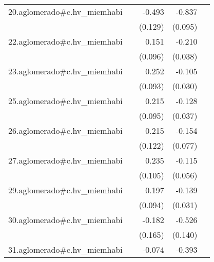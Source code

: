 {\begin{longtable}{l*{4}{D{.}{.}{-1}}}
\addlinespace
20.aglomerado#c.hv\_miemhabi&                     &      -0.493\sym{***}&      -0.837\sym{***}&                     \\
            &                     &     (0.129)         &     (0.095)         &                     \\
\addlinespace
22.aglomerado#c.hv\_miemhabi&                     &       0.151         &      -0.210\sym{***}&                     \\
            &                     &     (0.096)         &     (0.038)         &                     \\
\addlinespace
23.aglomerado#c.hv\_miemhabi&                     &       0.252\sym{**} &      -0.105\sym{***}&                     \\
            &                     &     (0.093)         &     (0.030)         &                     \\
\addlinespace
25.aglomerado#c.hv\_miemhabi&                     &       0.215\sym{*}  &      -0.128\sym{***}&                     \\
            &                     &     (0.095)         &     (0.037)         &                     \\
\addlinespace
26.aglomerado#c.hv\_miemhabi&                     &       0.215         &      -0.154\sym{*}  &                     \\
            &                     &     (0.122)         &     (0.077)         &                     \\
\addlinespace
27.aglomerado#c.hv\_miemhabi&                     &       0.235\sym{*}  &      -0.115\sym{*}  &                     \\
            &                     &     (0.105)         &     (0.056)         &                     \\
\addlinespace
29.aglomerado#c.hv\_miemhabi&                     &       0.197\sym{*}  &      -0.139\sym{***}&                     \\
            &                     &     (0.094)         &     (0.031)         &                     \\
\addlinespace
30.aglomerado#c.hv\_miemhabi&                     &      -0.182         &      -0.526\sym{***}&                     \\
            &                     &     (0.165)         &     (0.140)         &                     \\
\addlinespace
31.aglomerado#c.hv\_miemhabi&                     &      -0.074         &      -0.393\sym{***}&                     \\

\end{longtable}}
